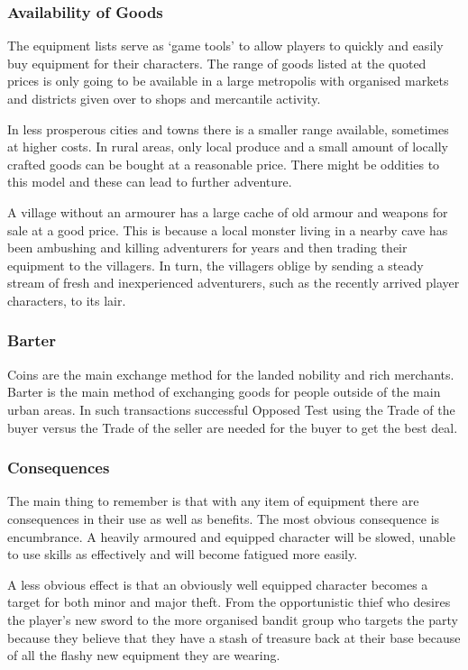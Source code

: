 \subsubsection{Availability of Goods}
The equipment lists serve as ‘game tools’ to allow players to quickly and easily buy equipment for their characters. The range of goods listed at the quoted prices is only going to be available in a large metropolis with organised markets and districts given over to shops and mercantile activity. 

In less prosperous cities and towns there is a smaller range available, sometimes at higher costs. In rural areas, only local produce and a small amount of locally crafted goods can be bought at a reasonable price. There might be oddities to this model and these can lead to further adventure. 

\begin{rpg-examplebox}
A village without an armourer has a large cache of old armour and weapons for sale at a good price. This is because a local monster living in a nearby cave has been ambushing and killing adventurers for years and then trading their equipment to the villagers. In turn, the villagers oblige by sending a steady stream of fresh and inexperienced adventurers, such as the recently arrived player characters, to its lair.
\end{rpg-examplebox}

\subsubsection{Barter}
Coins are the main exchange method for the landed nobility and rich merchants. Barter is the main method of exchanging goods for people outside of the main urban areas. In such transactions successful Opposed Test using the Trade of the buyer versus the Trade of the seller are needed for the buyer to get the best deal.

\subsubsection{Consequences}
The main thing to remember is that with any item of equipment there are consequences in their use as well as benefits. The most obvious consequence is encumbrance. A heavily armoured and equipped character will be slowed, unable to use skills as effectively and will become fatigued more easily.

A less obvious effect is that an obviously well equipped character becomes a target for both minor and major theft. From the opportunistic thief who desires the player’s new sword to the more organised bandit group who targets the party because they believe that they have a stash of treasure back at their base because of all the flashy new equipment they are wearing.

